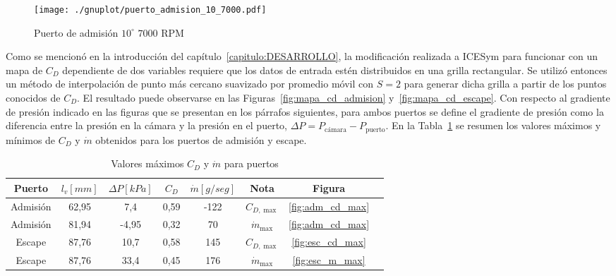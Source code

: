 \begin{figure}[h!]
  \centering
  \texttt{[image: ./gnuplot/puerto\_admision\_10\_7000.pdf]}
  \caption{Puerto de admisión $10^{\circ}$ \@ $7000$ RPM}\label{fig:adm_10_7000rpm}
\end{figure}

Como se mencionó en la introducción del capítulo~\ref{capitulo:DESARROLLO}, la
modificación realizada a ICESym para funcionar con un mapa de $C_{D}$
dependiente de dos variables requiere que los datos de entrada estén
distribuidos en una grilla rectangular.
%
Se utilizó entonces un método de interpolación de punto más cercano suavizado
por promedio móvil con $S=2$ para generar dicha grilla a partir de los puntos
conocidos de $C_{D}$.
%
El resultado puede observarse en las Figuras~\ref{fig:mapa_cd_admision}
y~\ref{fig:mapa_cd_escape}.
%
Con respecto al gradiente de presión indicado en las figuras que se presentan en
los párrafos siguientes, para ambos puertos se define el gradiente de presión
como la diferencia entre la presión en la cámara y la presión en el puerto,
$\Delta P = P_{\text{c\'amara}} - P_{\text{puerto}}$.
%
En la Tabla~\ref{tab:resumen_puertos} se resumen los valores máximos y mínimos
de $C_{D}$ y $\dot{m}$ obtenidos para los puertos de admisión y escape.

\begin{table}[h!]
  \centering
  \begin{tabular}{cccccccc}\toprule
    Puerto   & $l_{v} [mm]$ & $\Delta P [kPa]$ & $C_{D}$ & $\dot{m} [g/seg]$ & Nota            & Figura\\ \midrule
    Admisión & 62,95        &  7,4            & 0,59   & -122              & $C_{D,\max}$     &\ref{fig:adm_cd_max} \\
    Admisión & 81,94        &  -4,95           & 0,32   &   70              & $\dot{m}_{\max}$ &\ref{fig:adm_cd_max} \\
    Escape   & 87,76        & 10,7            & 0,58   &  145              & $C_{D,\max}$     &\ref{fig:esc_cd_max}\\
    Escape   & 87,76        & 33,4            & 0,45   &  176              & $\dot{m}_{\max}$ &\ref{fig:esc_m_max}\\ \bottomrule
  \end{tabular}
  \caption{Valores máximos $C_{D}$ y $\dot{m}$ para puertos}\label{tab:resumen_puertos}
\end{table}


